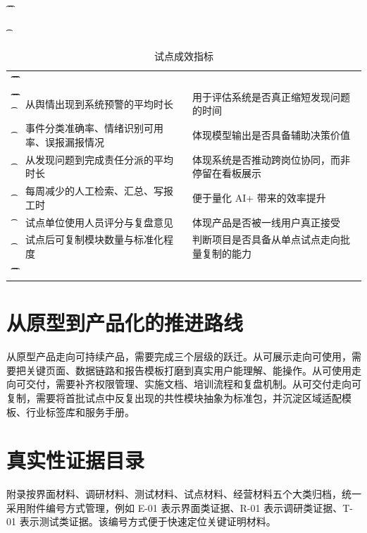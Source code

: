 \begin{table}[htbp]
	\t\centering
	\t\caption{试点成效指标}
	\t\begin{tabularx}{\textwidth}{|L{3cm}L{3cm}Y|}
		\t\t\toprule
		\t\t{} &          &             \\
		\t\t\midrule
		\t\t{}
		\t{}           & 从舆情出现到系统预警的平均时长        & 用于评估系统是否真正缩短发现问题的时间     \\
		\t{}           & 事件分类准确率、情绪识别可用率、误报漏报情况 & 体现模型输出是否具备辅助决策价值        \\
		\t{}           & 从发现问题到完成责任分派的平均时长      & 体现系统是否推动跨岗位协同，而非停留在看板展示 \\
		\t{}           & 每周减少的人工检索、汇总、写报工时      & 便于量化 AI+ 带来的效率提升        \\
		\t{}          & 试点单位使用人员评分与复盘意见        & 体现产品是否被一线用户真正接受         \\
		\t{}           & 试点后可复制模块数量与标准化程度       & 判断项目是否具备从单点试点走向批量复制的能力  \\
		\t\t\bottomrule
		\t\end{tabularx}
\end{table}

\section{从原型到产品化的推进路线}

从原型产品走向可持续产品，需要完成三个层级的跃迁。从可展示走向可使用，需要把关键页面、数据链路和报告模板打磨到真实用户能理解、能操作。从可使用走向可交付，需要补齐权限管理、实施文档、培训流程和复盘机制。从可交付走向可复制，需要将首批试点中反复出现的共性模块抽象为标准包，并沉淀区域适配模板、行业标签库和服务手册。

\section{真实性证据目录}

附录按界面材料、调研材料、测试材料、试点材料、经营材料五个大类归档，统一采用附件编号方式管理，例如 E-01 表示界面类证据、R-01 表示调研类证据、T-01 表示测试类证据。该编号方式便于快速定位关键证明材料。
